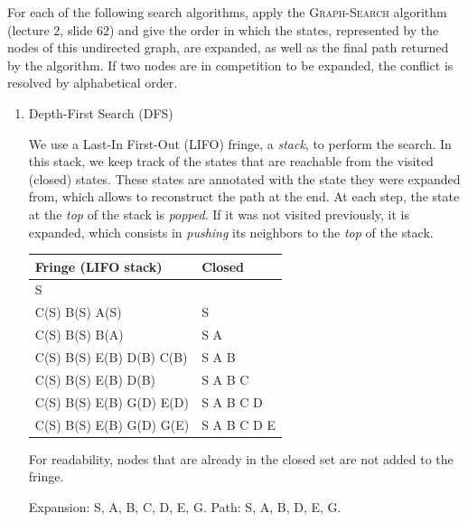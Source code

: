 \documentclass[11pt, a4paper]{article}
\begin{document}
For each of the following search algorithms, apply the \textsc{Graph-Search} algorithm (lecture 2, slide 62) and give the order in which the states, represented by the nodes of this undirected graph, are expanded, as well as the final path returned by the algorithm. If two nodes are in competition to be expanded, the conflict is resolved by alphabetical order.

\begin{solution}
    \newpage
\end{solution}

\begin{enumerate}
    \item Depth-First Search (DFS)

    \begin{solution}
        We use a Last-In First-Out (LIFO) fringe, \ie{} a \emph{stack}, to perform the search. In this stack, we keep track of the states that are reachable from the visited (closed) states. These states are annotated with the state they were expanded from, which allows to reconstruct the path at the end. At each step, the state at the \emph{top} of the stack is \emph{popped}. If it was not visited previously, it is expanded, which consists in \emph{pushing} its neighbors to the \emph{top} of the stack.

        \begin{table}[H]
            \centering
            \begin{tabular}{l|l}
                \toprule
                Fringe (LIFO stack) & Closed \\
                \midrule
                S & \\
                C(S) B(S) A(S) & S \\
                C(S) B(S) B(A) & S A \\
                C(S) B(S) E(B) D(B) C(B) & S A B \\
                C(S) B(S) E(B) D(B) & S A B C \\
                C(S) B(S) E(B) G(D) E(D) & S A B C D \\
                C(S) B(S) E(B) G(D) G(E) & S A B C D E \\
                \bottomrule
            \end{tabular}
        \end{table}

        For readability, nodes that are already in the closed set are not added to the fringe.

        Expansion: S, A, B, C, D, E, G. Path: S, A, B, D, E, G.
    \end{solution}


\end{enumerate}
\end{document}
